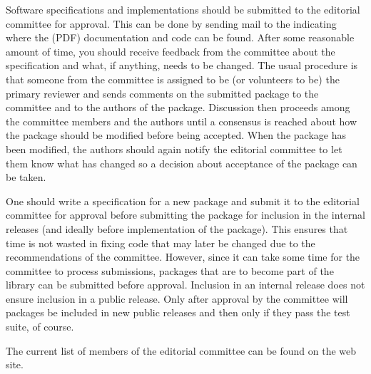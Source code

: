 Software specifications and implementations should be submitted to the
editorial committee for approval.  This can be done by sending mail to
the 
 indicating
where the (PDF) documentation and code can be found.  After
some reasonable amount of time, you should receive feedback from
the committee about the specification and what, if anything, needs to
be changed. The usual procedure is that someone from the committee is
assigned to be (or volunteers to be) the primary reviewer and sends
comments on the submitted package to the committee and to the authors of
the package.  Discussion then proceeds among the committee members and the
authors until a consensus is reached about how the package should be
modified before being accepted.  When the package has been modified,
the authors should again notify the editorial committee to let them
know what has changed so a decision about acceptance of the package
can be taken.

One should write a specification for a new package
and submit it to the editorial committee for
approval before submitting the package for inclusion in the internal
releases (and ideally before implementation of the package).  This
ensures that time is not wasted in fixing code that may later be changed
due to the recommendations of the committee.
However, since it can take some time for the committee to process
submissions, packages that are to become part of the library
can be submitted
 before approval.
Inclusion in an internal release does not ensure inclusion in a public
release.  Only after approval by the committee will packages be included in new
public releases and then only if they pass the test suite, of course.

The current list of members of the editorial committee can be found on the web site.

